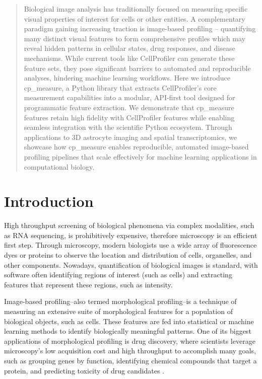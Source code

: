 \documentclass{article}
\begin{document}
\begin{abstract}
Biological image analysis has traditionally focused on measuring specific visual properties of interest for cells or other entities. 
A complementary paradigm gaining increasing traction is image-based profiling -- quantifying many distinct visual features to form comprehensive profiles which may reveal hidden patterns in cellular states, drug responses, and disease mechanisms.
While current tools like CellProfiler can generate these feature sets, they pose significant barriers to automated and reproducible analyses, hindering machine learning workflows. Here we introduce cp\_measure, a Python library that extracts CellProfiler's core measurement capabilities into a modular, API-first tool designed for programmatic feature extraction. We demonstrate that cp\_measure features retain high fidelity with CellProfiler features while enabling seamless integration with the scientific Python ecosystem. Through applications to 3D astrocyte imaging and spatial transcriptomics, we showcase how cp\_measure enables reproducible, automated image-based profiling pipelines that scale effectively for machine learning applications in computational biology.
\end{abstract}

\section{Introduction}
\label{sec:org4c9ba67}
High throughput screening of biological phenomena via complex modalities, such as RNA sequencing, is prohibitively expensive, therefore microscopy is an efficient first step. Through microscopy, modern biologists use a wide array of fluorescence dyes or proteins to observe the location and distribution of cells, organelles, and other components. Nowadays, quantification of biological images is standard, with software often identifying regions of interest (such as cells) and extracting features that represent these regions, such as intensity.

Image-based profiling--also termed morphological profiling--is a technique of measuring an extensive suite of morphological features for a population of biological objects, such as cells. 
These features are fed into statistical or machine learning methods to identify biologically meaningful patterns. One of its biggest applications of morphological profiling is drug discovery, where scientists leverage microscopy's low acquisition cost and high throughput to accomplish many goals, such as grouping genes by function, identifying chemical compounds that target a protein, and predicting toxicity of drug candidates \citep{chandrasekaranImagebasedProfilingDrug2021}. 
\end{document}
